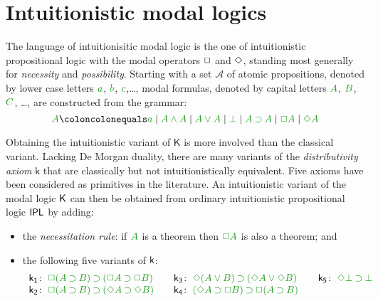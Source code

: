 %
%
\section{Intuitionistic modal logics}\label{sec:intmod}



The language of {intuitionisitic modal logic} is the one of intuitionistic propositional logic with the modal operators $\mathord{\Box}$ and $\mathord{\Diamond}$, standing most generally for \emph{necessity} and \emph{possibility}.
%
Starting with a set $\mathcal{A}$ of atomic propositions, denoted by lower case letters $\fm a$, $\fm b$, $\fm c$,\ldots, modal formulas, denoted by capital letters $\fm A$, $\fm B$, $\fm C$, \ldots, are constructed from the grammar:
%
$$
\fm A \coloncolonequals
\fm a \mid \fm{A \AND A} \mid \fm{A \OR A} \mid \fm \BOT \mid \fm{A \IMP A} \mid \fm{\BOX A} \mid \fm{\DIA A}
$$
%

Obtaining the intuitionistic variant of $\mathsf{K}$ is more involved than the classical variant. 
Lacking De Morgan duality, there are many variants of the \emph{distributivity axiom} $\mathsf{k}$ that are classically but not intuitionistically equivalent. Five axioms have been considered as primitives in the literature. An intuitionistic variant of the modal logic $\mathsf{K}$ can then be obtained from ordinary intuitionistic propositional logic $\mathsf{IPL}$ by adding:
%

\begin{itemize}
	\item the \emph{necessitation rule}: if $\fm A$ is a theorem then $\fm{\BOX A}$ is also a theorem; and
	\item the following five variants of $\mathsf{k}$:
	\begin{equation*}
	\label{eq:ik}%
	\begin{array}[t]{r@{\;}l@{\qquad}r@{\;}l@{\qquad}r@{\;}l}
	\kax[1]\colon&\fm{\BOX(A\IMP B)\IMP(\BOX A\IMP\BOX B)}
	&
	\kax[3]\colon&\fm{\DIA(A\OR B)\IMP(\DIA A\OR\DIA B)}
	&
	\kax[5]\colon&\fm{\DIA\BOT\IMP\BOT}
	\\
	\kax[2]\colon&\fm{\BOX(A\IMP B)\IMP(\DIA A\IMP\DIA B)}
	&
	\kax[4]\colon&\fm{(\DIA A\IMP \BOX B)\IMP\BOX(A\IMP B)}\\%
	\end{array}
	\end{equation*}
\end{itemize}

